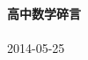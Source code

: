 \begin{center}
\vspace*{5cm}
{\LARGE{\textbf{高中数学碎言}}}\\[1cm]
\vspace*{7cm}
{}\\
\vspace*{0.3cm}
2014-05-25
\end{center}
